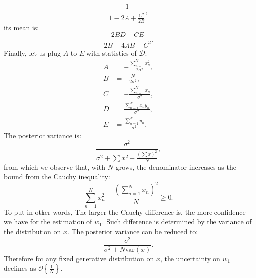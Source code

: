 \documentclass[UTF8]{ctexart}
\begin{document}
$$\frac{1}{1-2A+\frac{C^{2}}{2B}},$$
its mean is:
$$\frac{2BD-CE}{2B-4AB+C^{2}}.$$
Finally, let us plug $A$ to $E$ with statistics of $\mathcal{D}$:
$$
\begin{aligned}
A&=-\frac{\sum_{n=1}^{N}x_{n}^{2}}{2\sigma^{2}},\\
B&=-\frac{N}{2\sigma^{2}},\\
C&=-\frac{\sum_{n=1}^{N}x_{n}}{\sigma^{2}},\\
D&=\frac{\sum_{n=1}^{N}x_{n}y_{n}}{\sigma^{2}},\\
E&=\frac{\sum_{n=1}^{N}y_{n}}{\sigma^{2}}.
\end{aligned}
$$
The posterior variance is:
$$\frac{\sigma^{2}}{\sigma^{2}+\sum x^{2}-\frac{(\sum x)^{2}}{N}},$$
from which we observe that, with $N$ grows, the denominator increases as the bound from the Cauchy inequality:
$$\sum_{n=1}^{N}x_{n}^{2}-\frac{(\sum_{n=1}^{N}x_{n})^{2}}{N}\geq 0.$$
To put in other words, The larger the Cauchy difference is, the more confidence we have for the estimation of $w_{1}$.
Such difference is determined by the variance of the distribution on $x$.
The posterior variance can be reduced to:
$$\frac{\sigma^{2}}{\sigma^{2}+N\text{var}(x)}.$$
Therefore for any fixed generative distribution on $x$, the uncertainty on $w_{1}$ declines as $\mathcal{O}\left\{\frac{1}{N} \right\}$.
\end{document}

